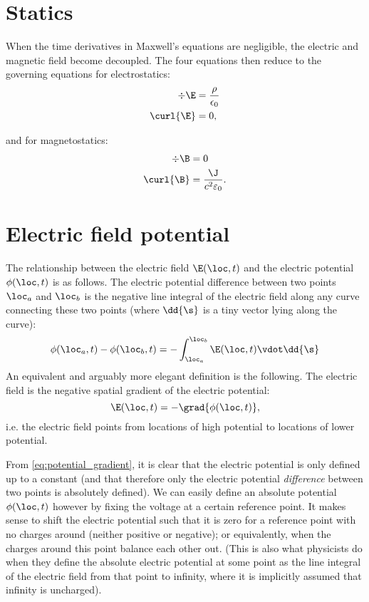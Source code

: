 \section{Statics}

When the time derivatives in Maxwell's equations are negligible, the electric and magnetic field become decoupled. The four equations then reduce to the governing equations for electrostatics:
%
\begin{align}
\div{\E} &= \frac{\rho}{\epsilon_0} \\
\curl{\E} &= 0,
\end{align}

and for magnetostatics:
%
\begin{align}
\div{\B} &= 0 \\
\curl{\B} &= \frac{\J}{c^2 \varepsilon_0}.
\end{align}





\section{Electric field potential}
\label{sec:appendix_potential}

The relationship between the electric field $\E(\loc,t)$ and the electric potential $\phi(\loc,t)$ is as follows. The electric potential difference between two points $\loc_a$ and $\loc_b$ is the negative line integral of the electric field along any curve connecting these two points (where $\dd{\s}$ is a tiny vector lying along the curve):
%
\begin{equation}
\phi(\loc_a,t) - \phi(\loc_b,t) 
    = - \int_{\loc_a}^{\loc_b} \E(\loc,t) \vdot \dd{\s}
\end{equation}
%
An equivalent and arguably more elegant definition is the following. The electric field is the negative spatial gradient of the electric potential:
%
\begin{equation}
\label{eq:potential_gradient}
\E(\loc,t) = -\grad{\phi(\loc,t)},
\end{equation}
%
i.e. the electric field points from locations of high potential to locations of lower potential.

From \cref{eq:potential_gradient}, it is clear that the electric potential is only defined up to a constant (and that therefore only the electric potential \emph{difference} between two points is absolutely defined). We can easily define an absolute potential $\phi(\loc,t)$ however by fixing the voltage at a certain reference point. It makes sense to shift the electric potential such that it is zero for a reference point with no charges around (neither positive or negative); or equivalently, when the charges around this point balance each other out. (This is also what physicists do when they define the absolute electric potential at some point as the line integral of the electric field from that point to infinity, where it is implicitly assumed that infinity is uncharged).







